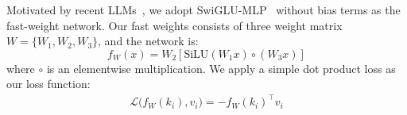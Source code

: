 Motivated by recent 
LLMs~\cite{touvron2023llama}, we adopt SwiGLU-MLP~\cite{shazeer2020glu} without bias terms as the fast-weight 
network. 
Our fast weights consists of three weight matrix $W = \{W_1, W_2, W_3\}$, and the network 
is:
\begin{equation}
f_W(x) = W_2 \left[ \mathrm{SiLU}(W_1 x) \circ (W_3 x) \right]
\label{eq:swiglu}
\end{equation}
where $\circ$ is an elementwise multiplication. 
We apply a simple dot product loss as our loss function:
\begin{align}
    \mathcal{L} \big(f_W(k_i), v_i\big) = -f_W(k_i)^\top v_i 
\label{eq:loss}
\end{align}

